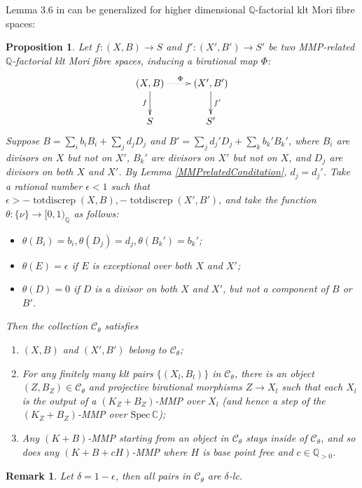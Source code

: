 \documentclass[11pt]{amsart}
\newtheorem{prop}[defn]{Proposition}
\newtheorem{rmk}[defn]{Remark}
\begin{document}
Lemma 3.6 in \cite{brunoLogSarkisovProgram1995} can be generalized for higher dimensional $\mathbb{Q}$-factorial klt Mori fibre spaces:
\begin{prop}\label{cat}
  Let $ f:(X,B)\to S$ and $f':(X',B')\to S' $ be two MMP-related $ \mathbb{Q} $-factorial klt Mori fibre spaces, inducing a birational map $\Phi$:
  \[ \xymatrix{
      (X,B)\ar[d]_f\ar@{.>}[r]^\Phi&(X',B')\ar[d]^{f'}\\
 S&S'} \]
 Suppose  $ B=\sum_ib_iB_i+\sum_jd_jD_j $ and $ B'=\sum_jd_j'D_j+\sum_kb_k'B_k' $, where $ B_i $ are divisors on $ X $ but not on $ X' $, $ B_k' $ are divisors on $ X' $ but not on $ X $, and $ D_j $ are divisors on both $ X $ and $ X' $. By Lemma \ref{MMPrelatedConditation}, $ d_j=d_j' $. Take a rational number $ \epsilon<1 $ such that $ \epsilon> -\operatorname{totdiscrep}(X,B),-\operatorname{totdiscrep}(X',B') $, and take the function $ \theta:\{\nu\}\to [0,1)_\mathbb{Q} $ as follows:
  \begin{itemize}
    \item $ \theta(B_i)=b_i, \theta(D_j)=d_j,\theta(B_k')=b_k'$;
    \item $ \theta(E)=\epsilon $ if $ E $ is exceptional over both $ X $ and $ X' $;
    \item $ \theta(D)=0 $ if $ D $ is a divisor on both $ X $ and $ X' $, but not a component of $ B $ or $ B' $.
  \end{itemize}
  Then the collection $ \mathcal{C}_\theta $ satisfies
  \begin{enumerate}
    \item $ (X,B) $ and $ (X',B') $ belong to $ \mathcal{C}_\theta $;
    \item For any finitely many klt pairs $ \{(X_l,B_l)\} $ in $ \mathcal{C}_\theta $, there is an object $ (Z,B_Z)\in \mathcal{C}_\theta $ and projective birational morphisms $ Z\to X_l $ such that each $X_l$ is the output of a  $ (K_{Z}+B_{Z}) $-MMP over $ X_l $ (and hence a step of the $(K_Z+B_Z)$-MMP over $ \mathrm{Spec}\,\mathbb{C} $);
    \item Any $ (K+B) $-MMP starting from an object in $ \mathcal{C}_\theta $ stays inside of $ \mathcal{C}_\theta $, and so does any $ (K+B+cH) $-MMP where $ H $ is base point free and $ c\in \mathbb{Q}_{>0} $.
  \end{enumerate}
\end{prop}
\begin{rmk}\label{delta-lc}
Let $\delta=1-\epsilon$, then all pairs in $\mathcal{C}_{\theta}$ are $\delta$-lc. 
\end{rmk}
\end{document}
